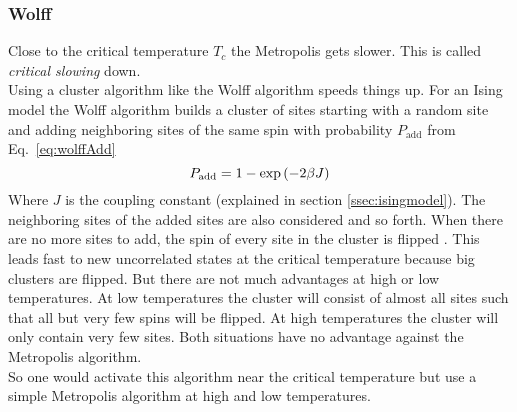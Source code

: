     \subsubsection{Wolff}
    \label{sssec:wolff}
        Close to the critical temperature \(T_c\) the Metropolis
        gets slower. This is called \emph{critical slowing} down.\\
        Using a cluster algorithm like the Wolff
        algorithm \cite{Wolff1989} speeds things up.
        For an Ising model the Wolff algorithm builds a cluster of sites
        starting with a random site and adding neighboring sites of the
        same spin with probability \(P_{\mathrm{add}}\) from Eq.\ \eqref{eq:wolffAdd}
        \begin{equation}
            P_{\mathrm{add}} = 1-\exp\left(-2\beta J\right)
            \label{eq:wolffAdd}
        \end{equation}
        Where \(J\) is the coupling constant (explained in section
        \ref{ssec:isingmodel}). The neighboring sites of the added sites
        are also considered and so forth. When there are no more sites
        to add, the spin of every site in the cluster is flipped
        \cite[p. 91ff]{NewmanBarkema1999} \cite[p. 151f]{Katzgraber2011}.
        This leads fast to new uncorrelated states at the critical
        temperature because big clusters are flipped. But there are not
        much advantages at high or low temperatures. At low temperatures
        the cluster will consist of almost all sites such that all but
        very few spins will be flipped. At high temperatures the cluster
        will only contain very few sites.
        Both situations have no advantage against the Metropolis algorithm.\\
        So one would activate this algorithm near the critical temperature
        but use a simple Metropolis algorithm at high and low temperatures.

